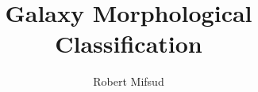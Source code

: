 \documentclass[oneside]{um-fict}  %
\title{Galaxy Morphological Classification}  %
\author{Robert Mifsud}            %
\begin{document}
\frontmatter 
    \maketitle
%         
    
    \tableofcontents*\if@openright\cleardoublepage\else\clearpage\fi
    \listoffigures\if@openright\cleardoublepage\else\clearpage\fi
    \listoftables\if@openright\cleardoublepage\else\clearpage\fi

\mainmatter 
    
    
{%
    \if@openright\cleardoublepage\else\clearpage\fi
    {\scriptsize}

	\printindex
}

\appendix
    
\end{document}
